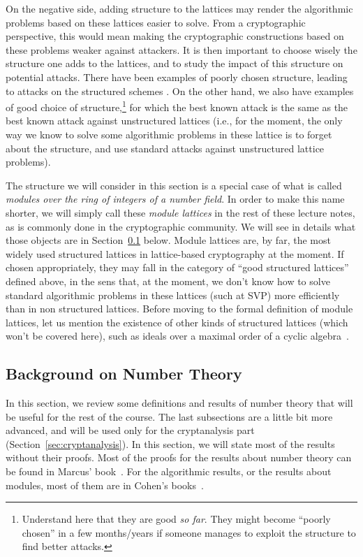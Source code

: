 On the negative side, adding structure to the lattices may render the algorithmic problems based on these lattices easier to solve. From a cryptographic perspective, this would mean making the cryptographic constructions based on these problems weaker against attackers. It is then important to choose wisely the structure one adds to the lattices, and to study the impact of this structure on potential attacks.
There have been examples of poorly chosen structure, leading to attacks on the structured schemes \cite{BLA}.
On the other hand, we also have examples of good choice of structure,\footnote{Understand here that they are good \emph{so far}. They might become ``poorly chosen'' in a few months/years if someone manages to exploit the structure to find better attacks.} for which the best known attack is the same as the best known attack against unstructured lattices (i.e., for the moment, the only way we know to solve some algorithmic problems in these lattice is to forget about the structure, and use standard attacks against unstructured lattice problems).

The structure we will consider in this section is a special case of what is called \emph{modules over the ring of integers of a number field}. In order to make this name shorter, we will simply call these \emph{module lattices} in the rest of these lecture notes, as is commonly done in the cryptographic community. We will see in details what those objects are in Section~\ref{sec:number-theory} below. Module lattices are, by far, the most widely used structured lattices in lattice-based cryptography at the moment. If chosen appropriately, they may fall in the category of ``good structured lattices'' defined above, in the sens that, at the moment, we don't know how to solve standard algorithmic problems in these lattices (such at SVP) more efficiently than in non structured lattices.
Before moving to the formal definition of module lattices, let us mention the existence of other kinds of structured lattices (which won't be covered here), such as ideals over a maximal order of a cyclic algebra~\cite{CLWE}.


\subsection{Background on Number Theory}
\label{sec:number-theory}
In this section, we review some definitions and results of number theory that will be useful for the rest of the course. The last subsections are a little bit more advanced, and will be used only for the cryptanalysis part (Section~\ref{sec:cryptanalysis}). In this section, we will state most of the results without their proofs. Most of the proofs for the results about number theory can be found in Marcus' book~\cite{Marcus}. For the algorithmic results, or the results about modules, most of them are in Cohen's books~\cite{Cohen1, Cohen2}.
